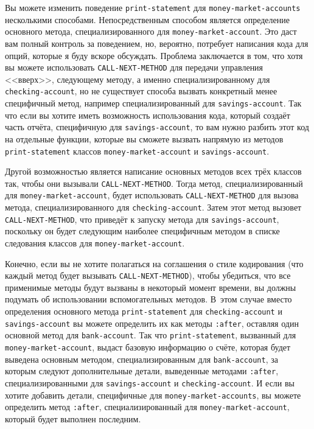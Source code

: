 Вы можете изменить поведение \lstinline{print-statement} для \lstinline{money-market-accounts}
несколькими способами.  Непосредственным способом является определение основного метода,
спе\-циа\-ли\-зи\-ро\-ван\-но\-го для \lstinline{money-market-account}.  Это даст вам полный контроль за
поведением, но, вероятно, потребует написания кода для опций, которые я буду вскоре
обсуждать.  Проблема заключается в том, что хотя вы можете использовать
\lstinline{CALL-NEXT-METHOD} для передачи управления <<вверх>>, следующему методу, а именно
специализированному для \lstinline{checking-account}, но не существует способа вызвать
конкретный менее специфичный метод, например специализированный для
\lstinline{savings-account}.  Так что если вы хотите иметь возможность использования кода,
который создаёт часть отчёта, специфичную для \lstinline{savings-account}, то вам нужно разбить
этот код на отдельные функции, которые вы сможете вызвать напрямую из методов
\lstinline{print-statement} классов \lstinline{money-market-account} и \lstinline{savings-account}.

Другой возможностью является написание основных методов всех трёх классов так, чтобы они
вызывали \lstinline{CALL-NEXT-METHOD}.  Тогда метод, специализированный для
\lstinline{money-market-account}, будет использовать \lstinline{CALL-NEXT-METHOD} для вызова метода,
специализированного для \lstinline{checking-account}.  Затем этот метод вызовет
\lstinline{CALL-NEXT-METHOD}, что приведёт к запуску метода для \lstinline{savings-account},
поскольку он будет следующим наиболее специфичным методом в списке следования классов для
\lstinline{money-market-account}.

Конечно, если вы не хотите полагаться на соглашения о стиле кодирования (что каждый метод
будет вызывать \lstinline{CALL-NEXT-METHOD}), чтобы убедиться, что все применимые методы будут
вызваны в некоторый момент времени, вы должны подумать об использовании вспомогательных
методов.  В~этом случае вместо определения основного метода \lstinline{print-statement} для
\lstinline{checking-account} и \lstinline{savings-account} вы можете определить их как методы
\lstinline{:after}, оставляя один основной метод для \lstinline{bank-account}.  Так что
\lstinline{print-statement}, вызванный для \lstinline{money-market-account}, выдаст базовую
информацию о счёте, которая будет выведена основным методом, специализированным для
\lstinline{bank-account}, за которым следуют дополнительные детали, выведенные методами
\lstinline{:after}, специализированными для \lstinline{savings-account} и \lstinline{checking-account}. И
если вы хотите добавить детали, специфичные для \lstinline{money-market-accounts}, вы можете
определить метод \lstinline{:after}, специализированный для \lstinline{money-market-account},
который будет выполнен последним.

